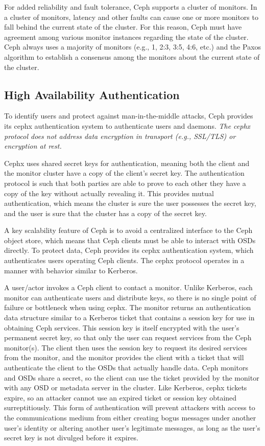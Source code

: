 \documentclass[12pt,a4paper]{report}
\begin{document}
For added reliability and fault tolerance, Ceph supports a cluster of monitors.
In a cluster of monitors, latency and other faults can cause one or more
monitors to fall behind the current state of the cluster. For this reason, Ceph
must have agreement among various monitor instances regarding the state of the
cluster. Ceph always uses a majority of monitors (e.g., 1, 2:3, 3:5, 4:6, etc.)
and the Paxos algorithm to establish a consensus among the monitors about the
current state of the cluster.

\subsection{High Availability Authentication}
To identify users and protect against man-in-the-middle attacks, Ceph provides
its cephx authentication system to authenticate users and daemons.  \emph{The
cephx protocol does not address data encryption in transport (e.g., SSL/TLS) or
encryption at rest.}

Cephx uses shared secret keys for authentication, meaning both the client and
the monitor cluster have a copy of the client’s secret key. The authentication
protocol is such that both parties are able to prove to each other they have a
copy of the key without actually revealing it. This provides mutual
authentication, which means the cluster is sure the user possesses the secret
key, and the user is sure that the cluster has a copy of the secret key.

A key scalability feature of Ceph is to avoid a centralized interface to the
Ceph object store, which means that Ceph clients must be able to interact with
OSDs directly. To protect data, Ceph provides its cephx authentication system,
which authenticates users operating Ceph clients. The cephx protocol operates
in a manner with behavior similar to Kerberos.

A user/actor invokes a Ceph client to contact a monitor. Unlike Kerberos, each
monitor can authenticate users and distribute keys, so there is no single point
of failure or bottleneck when using cephx. The monitor returns an
authentication data structure similar to a Kerberos ticket that contains a
session key for use in obtaining Ceph services. This session key is itself
encrypted with the user’s permanent secret key, so that only the user can
request services from the Ceph monitor(s). The client then uses the session key
to request its desired services from the monitor, and the monitor provides the
client with a ticket that will authenticate the client to the OSDs that
actually handle data. Ceph monitors and OSDs share a secret, so the client can
use the ticket provided by the monitor with any OSD or metadata server in the
cluster. Like Kerberos, cephx tickets expire, so an attacker cannot use an
expired ticket or session key obtained surreptitiously. This form of
authentication will prevent attackers with access to the communications medium
from either creating bogus messages under another user’s identity or altering
another user’s legitimate messages, as long as the user’s secret key is not
divulged before it expires.
\end{document}
